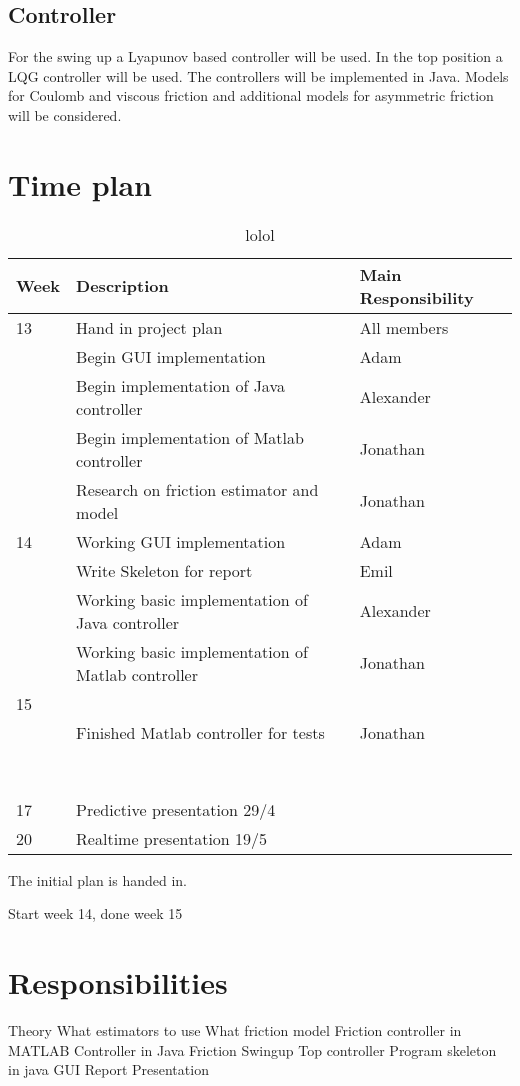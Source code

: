 \documentclass[10pt,a4paper]{article}
\begin{document}

\subsection{Controller}
For the swing up a Lyapunov based controller will be used. In the top position a LQG controller will be used. The controllers will be implemented in Java.
Models for Coulomb and viscous friction and additional models for asymmetric friction will be considered. 

\section{Time plan}
\begin{table}[]
\centering
\caption{lolol}
\label{hoho}
\begin{tabular}{|l|l|l|}
\hline
Week & Description & Main Responsibility \\ \hline
13 & Hand in project plan & All members \\ \hline
& Begin GUI implementation & Adam \\ \hline
& Begin implementation of Java controller & Alexander \\ \hline
& Begin implementation of Matlab controller & Jonathan \\ \hline
& Research on friction estimator and model & Jonathan \\ \hline
14 & Working GUI implementation & Adam \\ \hline
& Write Skeleton for report & Emil \\ \hline
& Working basic implementation of Java controller & Alexander \\ \hline
& Working basic implementation of Matlab controller & Jonathan \\ \hline
15 & & \\ \hline
& Finished Matlab controller for tests & Jonathan \\ \hline
& & \\ \hline
& & \\ \hline
& & \\ \hline
& & \\ \hline
& & \\ \hline
& & \\ \hline
& & \\ \hline
& & \\ \hline
17 & Predictive presentation 29/4 & \\ \hline
20 & Realtime presentation 19/5  & \\ \hline
\end{tabular}
\end{table}
The initial plan is handed in.


Start week 14, done week 15

\section{Responsibilities}
Theory
	What estimators to use
	What friction model
Friction controller in MATLAB
Controller in Java
	Friction
	Swingup
	Top controller
Program skeleton in java
GUI
Report
Presentation
\end{document}
